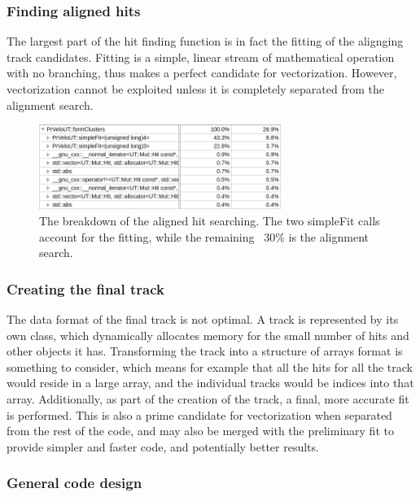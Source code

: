 \documentclass[12pt]{article}
\begin{document}
\subsubsection{Finding aligned hits}

The largest part of the hit finding function is in fact the fitting of the alignging track candidates. Fitting is a simple, linear stream of mathematical operation with no branching, thus makes a perfect candidate for vectorization. However, vectorization cannot be exploited unless it is completely separated from the alignment search.

\begin{figure}[H]
	\begin{center}
		\includegraphics[width=0.7\textwidth]{velout_hotspots_orig_formclusters}
	\end{center}
	\caption{The breakdown of the aligned hit searching. The two simpleFit calls account for the fitting, while the remaining ~30\% is the alignment search.}
	\label{fig_velout_hotspots_orig_formclusters}
\end{figure}


\subsubsection{Creating the final track}

The data format of the final track is not optimal. A track is represented by its own class, which dynamically allocates memory for the small number of hits and other objects it has. Transforming the track into a structure of arrays format is something to consider, which means for example that all the hits for all the track would reside in a large array, and the individual tracks would be indices into that array.
Additionally, as part of the creation of the track, a final, more accurate fit is performed. This is also a prime candidate for vectorization when separated from the rest of the code, and may also be merged with the preliminary fit to provide simpler and faster code, and potentially better results.

\subsubsection{General code design}
\end{document}
